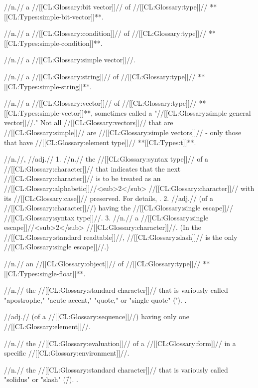  //n.// a //[[CL:Glossary:bit vector]]// of //[[CL:Glossary:type]]// **[[CL:Types:simple-bit-vector]]**.

 //n.// a //[[CL:Glossary:condition]]// of //[[CL:Glossary:type]]// **[[CL:Types:simple-condition]]**.

 //n.// a //[[CL:Glossary:simple vector]]//.

 //n.// a //[[CL:Glossary:string]]// of //[[CL:Glossary:type]]// **[[CL:Types:simple-string]]**.

 //n.// a //[[CL:Glossary:vector]]// of //[[CL:Glossary:type]]// **[[CL:Types:simple-vector]]**, sometimes called a "//[[CL:Glossary:simple general vector]]//." Not all //[[CL:Glossary:vectors]]// that are //[[CL:Glossary:simple]]// are //[[CL:Glossary:simple vectors]]// - only those that have //[[CL:Glossary:element type]]// **[[CL:Types:t]]**.

 //n.//, //adj.// 1. //n.// the //[[CL:Glossary:syntax type]]// of a //[[CL:Glossary:character]]// that indicates that the next //[[CL:Glossary:character]]// is to be treated as an //[[CL:Glossary:alphabetic]]//<sub>2</sub> //[[CL:Glossary:character]]// with its //[[CL:Glossary:case]]// preserved. For details, \seesection\SingleEscapeChar. 2. //adj.// (of a //[[CL:Glossary:character]]//) having the //[[CL:Glossary:single escape]]// //[[CL:Glossary:syntax type]]//. 3. //n.// a //[[CL:Glossary:single escape]]//<sub>2</sub> //[[CL:Glossary:character]]//. (In the //[[CL:Glossary:standard readtable]]//, //[[CL:Glossary:slash]]// is the only //[[CL:Glossary:single escape]]//.)

 //n.// an //[[CL:Glossary:object]]// of //[[CL:Glossary:type]]// **[[CL:Types:single-float]]**.

 //n.// the //[[CL:Glossary:standard character]]// that is variously called "apostrophe," "acute accent," "quote," or "single quote" (\f{'}). \Seefigure\StdCharsThree.

 //adj.// (of a //[[CL:Glossary:sequence]]//) having only one //[[CL:Glossary:element]]//. 

 //n.// the //[[CL:Glossary:evaluation]]// of a //[[CL:Glossary:form]]// in a specific //[[CL:Glossary:environment]]//.

 //n.// the //[[CL:Glossary:standard character]]// that is variously called "solidus" or "slash" (\f{/}). \Seefigure\StdCharsThree.

